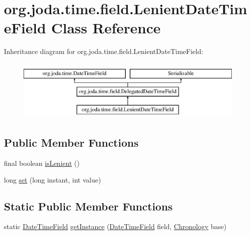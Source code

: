 \hypertarget{classorg_1_1joda_1_1time_1_1field_1_1_lenient_date_time_field}{\section{org.\-joda.\-time.\-field.\-Lenient\-Date\-Time\-Field Class Reference}
\label{classorg_1_1joda_1_1time_1_1field_1_1_lenient_date_time_field}
}
Inheritance diagram for org.\-joda.\-time.\-field.\-Lenient\-Date\-Time\-Field\-:\begin{figure}[H]
\begin{center}
\leavevmode
\includegraphics[height=3.000000cm]{classorg_1_1joda_1_1time_1_1field_1_1_lenient_date_time_field}
\end{center}
\end{figure}
\subsection*{Public Member Functions}
\begin{DoxyCompactItemize}
\item 
final boolean \hyperlink{classorg_1_1joda_1_1time_1_1field_1_1_lenient_date_time_field_a5b81a553528939dfe1ed9f8f1451bc0b}{is\-Lenient} ()
\item 
long \hyperlink{classorg_1_1joda_1_1time_1_1field_1_1_lenient_date_time_field_a6fb7abba6bccf10aeee3f5e16705c91a}{set} (long instant, int value)
\end{DoxyCompactItemize}
\subsection*{Static Public Member Functions}
\begin{DoxyCompactItemize}
\item 
static \hyperlink{classorg_1_1joda_1_1time_1_1_date_time_field}{Date\-Time\-Field} \hyperlink{classorg_1_1joda_1_1time_1_1field_1_1_lenient_date_time_field_a7f7e9a002c10f37d9f710ab7578c460c}{get\-Instance} (\hyperlink{classorg_1_1joda_1_1time_1_1_date_time_field}{Date\-Time\-Field} field, \hyperlink{classorg_1_1joda_1_1time_1_1_chronology}{Chronology} base)
\end{DoxyCompactItemize}
